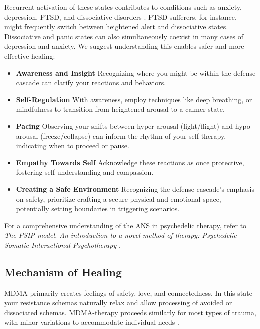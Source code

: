 \documentclass[12pt,letterpaper]{article}
\begin{document}
Recurrent activation of these states contributes to conditions such as anxiety, depression, PTSD, and dissociative disorders \cite{razviPSIP}. PTSD sufferers, for instance, might frequently switch between heightened alert and dissociative states. Dissociative and panic states can also simultaneously coexist in many cases of depression and anxiety. We suggest understanding this enables safer and more effective healing: 
\begin{itemize}
    \item \textbf{Awareness and Insight} Recognizing where you might be within the defense cascade can clarify your reactions and behaviors.
    \item \textbf{Self-Regulation} With awareness, employ techniques like deep breathing, or mindfulness to transition from heightened arousal to a calmer state.
    \item \textbf{Pacing} Observing your shifts between hyper-arousal (fight/flight) and hypo-arousal (freeze/collapse) can inform the rhythm of your self-therapy, indicating when to proceed or pause.
    \item \textbf{Empathy Towards Self} Acknowledge these reactions as once protective, fostering self-understanding and compassion.
    \item \textbf{Creating a Safe Environment} Recognizing the defense cascade's emphasis on safety, prioritize crafting a secure physical and emotional space, potentially setting boundaries in triggering scenarios.
\end{itemize}

For a comprehensive understanding of the ANS in psychedelic therapy, refer to \textit{The PSIP model. An introduction to a novel method of therapy: Psychedelic Somatic Interactional Psychotherapy} \cite{razviPSIP}.
\subsection{Mechanism of Healing}
MDMA primarily creates feelings of safety, love, and connectedness. In this state your resistance schemas naturally relax and allow processing of avoided or dissociated schemas. MDMA-therapy proceeds similarly for most types of trauma, with minor variations to accommodate individual needs \cite{otaloraMDMA}. 
\end{document}
